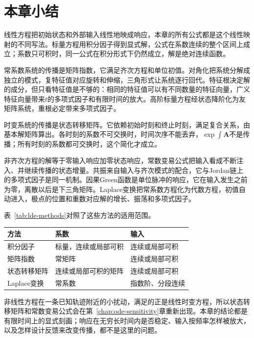 \section{本章小结}
\label{sec:lde-summary}

线性方程把初始状态和外部输入线性地映成响应，本章的所有公式都是这个线性映射的不同写法。标量方程用积分因子得到显式解，公式在系数连续的整个区间上成立；系数只可积时，同一公式在积分形式下仍然成立，解是绝对连续函数。

常系数系统的传播是矩阵指数，它满足齐次方程和单位初值。对角化把系统分解成独立的模式，复特征值对应旋转和伸缩，三角形式让系统逐行回代。特征根决定解的成分，但只看特征值是不够的：相同的特征值可以有不同数量的特征向量，广义特征向量带来$t$的多项式因子和有限时间的放大。高阶标量方程经状态降阶化为友矩阵系统，重根必定带来多项式因子。

时变系统的传播是状态转移矩阵。它依赖初始时刻和终止时刻，满足复合关系，由基本解矩阵算出。各时刻的系数不可交换时，时间次序不能丢弃，$\exp\int\bm{A}$不是传播；所有时刻的系数都可交换时，这个简化才成立。

非齐次方程的解等于零输入响应加零状态响应，常数变易公式把输入看成不断注入、并继续传播的状态增量。共振来自输入与齐次模式的配合，它与Jordan链上的多项式因子是同一机制。因果Green函数是单位脉冲的响应，它在输入发生之前为零，离散以后是下三角矩阵。Laplace变换把常系数方程化为代数方程，初值自动进入，极点的位置和重数对应解的增长、振荡和多项式因子。

表~\ref{tab:lde-methods}对照了这些方法的适用范围。

\begin{BookInlineTable}
  \centering
  \caption{线性初值问题的四种工具。}
  \label{tab:lde-methods}
  \begin{tabular}{lll}
    \toprule
    方法 & 系数 & 输入\\
    \midrule
    积分因子 & 标量，连续或局部可积 & 连续或局部可积\\
    矩阵指数 & 常矩阵 & 连续或局部可积\\
    状态转移矩阵 & 连续或局部可积的矩阵 & 连续或局部可积\\
    Laplace变换 & 常系数 & 指数阶、分段连续\\
    \bottomrule
  \end{tabular}
\end{BookInlineTable}

非线性方程在一条已知轨迹附近的小扰动，满足的正是线性时变方程，所以状态转移矩阵和常数变易公式会在第~\ref{chap:ode-sensitivity}章重新出现。本章的结论都是有限时间上的显式刻画；响应在无穷长时间内是否稳定、输入按频率怎样被放大，以及怎样设计反馈来改变传播，都不是这里的问题。

